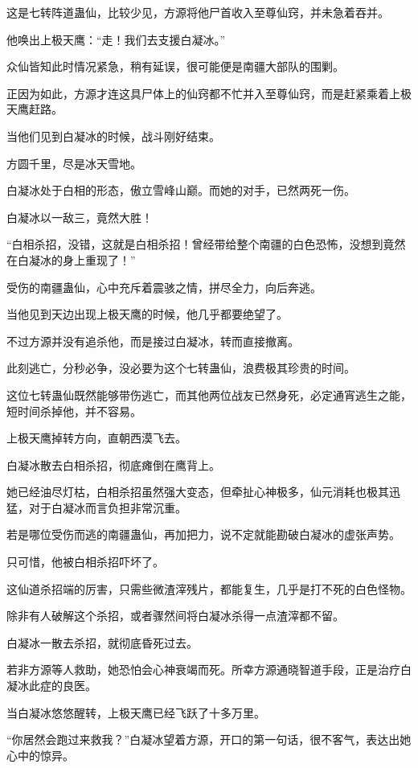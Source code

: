 \begin{this_body}
这是七转阵道蛊仙，比较少见，方源将他尸首收入至尊仙窍，并未急着吞并。

他唤出上极天鹰：“走！我们去支援白凝冰。”

众仙皆知此时情况紧急，稍有延误，很可能便是南疆大部队的围剿。

正因为如此，方源才连这具尸体上的仙窍都不忙并入至尊仙窍，而是赶紧乘着上极天鹰赶路。

当他们见到白凝冰的时候，战斗刚好结束。

方圆千里，尽是冰天雪地。

白凝冰处于白相的形态，傲立雪峰山巅。而她的对手，已然两死一伤。

白凝冰以一敌三，竟然大胜！

“白相杀招，没错，这就是白相杀招！曾经带给整个南疆的白色恐怖，没想到竟然在白凝冰的身上重现了！”

受伤的南疆蛊仙，心中充斥着震骇之情，拼尽全力，向后奔逃。

当他见到天边出现上极天鹰的时候，他几乎都要绝望了。

不过方源并没有追杀他，而是接过白凝冰，转而直接撤离。

此刻逃亡，分秒必争，没必要为这个七转蛊仙，浪费极其珍贵的时间。

这位七转蛊仙既然能够带伤逃亡，而其他两位战友已然身死，必定通宵逃生之能，短时间杀掉他，并不容易。

上极天鹰掉转方向，直朝西漠飞去。

白凝冰散去白相杀招，彻底瘫倒在鹰背上。

她已经油尽灯枯，白相杀招虽然强大变态，但牵扯心神极多，仙元消耗也极其迅猛，对于白凝冰而言负担非常沉重。

若是哪位受伤而逃的南疆蛊仙，再加把力，说不定就能勘破白凝冰的虚张声势。

只可惜，他被白相杀招吓坏了。

这仙道杀招端的厉害，只需些微渣滓残片，都能复生，几乎是打不死的白色怪物。

除非有人破解这个杀招，或者骤然间将白凝冰杀得一点渣滓都不留。

白凝冰一散去杀招，就彻底昏死过去。

若非方源等人救助，她恐怕会心神衰竭而死。所幸方源通晓智道手段，正是治疗白凝冰此症的良医。

当白凝冰悠悠醒转，上极天鹰已经飞跃了十多万里。

“你居然会跑过来救我？”白凝冰望着方源，开口的第一句话，很不客气，表达出她心中的惊异。


\end{this_body}
